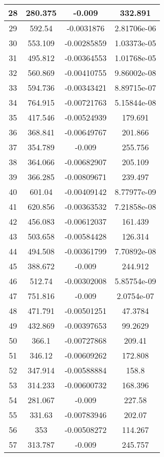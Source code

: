 \begin{table}[h]
{\begin{tabular}{|c|c|c|c|}
28	&	280.375	&	-0.009	&	332.891	\\	\hline
29	&	592.54	&	-0.0031876	&	2.81706e-06	\\	\hline
30	&	553.109	&	-0.00285859	&	1.03373e-05	\\	\hline
31	&	495.812	&	-0.00364553	&	1.01768e-05	\\	\hline
32	&	560.869	&	-0.00410755	&	9.86002e-08	\\	\hline
33	&	594.736	&	-0.00343421	&	8.89715e-07	\\	\hline
34	&	764.915	&	-0.00721763	&	5.15844e-08	\\	\hline
35	&	417.546	&	-0.00524939	&	179.691	\\	\hline
36	&	368.841	&	-0.00649767	&	201.866	\\	\hline
37	&	354.789	&	-0.009	&	255.756	\\	\hline
38	&	364.066	&	-0.00682907	&	205.109	\\	\hline
39	&	366.285	&	-0.00809671	&	239.497	\\	\hline
40	&	601.04	&	-0.00409142	&	8.77977e-09	\\	\hline
41	&	620.856	&	-0.00363532	&	7.21858e-08	\\	\hline
42	&	456.083	&	-0.00612037	&	161.439	\\	\hline
43	&	503.658	&	-0.00584428	&	126.314	\\	\hline
44	&	494.508	&	-0.00361799	&	7.70892e-08	\\	\hline
45	&	388.672	&	-0.009	&	244.912	\\	\hline
46	&	512.74	&	-0.00302008	&	5.85754e-09	\\	\hline
47	&	751.816	&	-0.009	&	2.0754e-07	\\	\hline
48	&	471.791	&	-0.00501251	&	47.3784	\\	\hline
49	&	432.869	&	-0.00397653	&	99.2629	\\	\hline
50	&	366.1	&	-0.00727868	&	209.41	\\	\hline
51	&	346.12	&	-0.00609262	&	172.808	\\	\hline
52	&	347.914	&	-0.00588884	&	158.8	\\	\hline
53	&	314.233	&	-0.00600732	&	168.396	\\	\hline
54	&	281.067	&	-0.009	&	227.58	\\	\hline
55	&	331.63	&	-0.00783946	&	202.07	\\	\hline
56	&	353	&	-0.00508272	&	114.267	\\	\hline
57	&	313.787	&	-0.009	&	245.757	\\	\hline

\end{tabular}}
\end{table}
